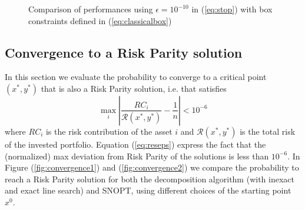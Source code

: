 \begin{figure}
{{
}
}
\caption{Comparison of performances using $\epsilon = 10^{-10}$ in (\ref{eq:stop}) with box constraints defined in (\ref{eq:classicalbox})}
\end{figure}

\subsection{Convergence to a Risk Parity solution}
In this section we evaluate the probability to converge to a critical point $(x^*,y^*)$ that is also a Risk Parity solution, i.e. that satisfies 
\begin{equation}\label{eq:reseps}
\max_i \left| \frac{RC_i}{\mathcal{R}(x^*,y^*)} - \frac{1}{n} \right| < 10^{-6}
\end{equation}
where $RC_i$ is the risk contribution of the asset $i$ and ${\mathcal{R}(x^*,y^*)}$ is the total risk of the invested portfolio. Equation (\ref{eq:reseps}) express the fact that the (normalized) max deviation from Risk Parity of the solutions is less than $10^{-6}$. In Figure (\ref{fig:convergence1}) and (\ref{fig:convergence2}) we compare the probability to reach a Risk Parity solution for both the decomposition algorithm (with inexact and exact line search) and SNOPT, using different choices of the starting point $x^0$. 

